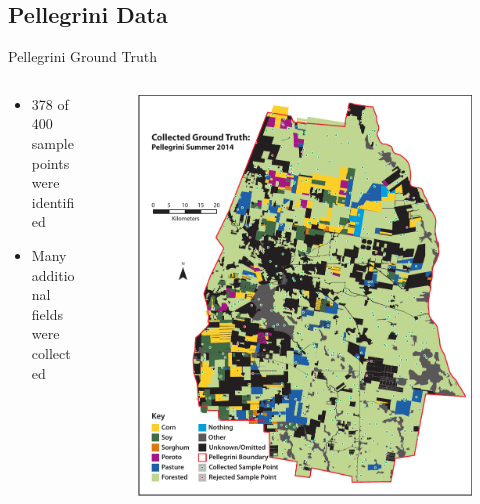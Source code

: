 \documentclass[  compress,xcolor={usenames,dvipsnames}]{beamer}
\begin{document}
\subsection{Pellegrini Data}
\begin{frame}{Pellegrini Ground Truth}
\begin{columns}[onlytextwidth]
\begin{column}{0.47\textwidth}
  \begin{itemize}
    \item 378 of 400 sample\\points were identified
    \item Many additional\\fields were collected
  \end{itemize}
\end{column}
\begin{column}{0.53\textwidth}
  \begin{figure}
    \includegraphics[width=1.0\textwidth]{Graphics/collecteddata.pdf}
  \end{figure}
\end{column}
\end{columns}
\end{frame}
\end{document}
